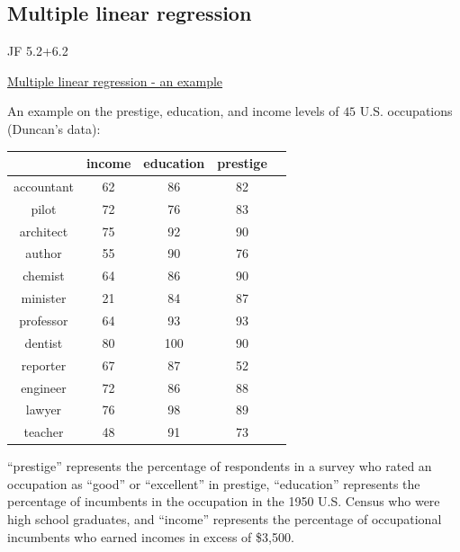 \subsection*{Multiple linear regression}
JF 5.2+6.2\\
\begin{center}
\underline{Multiple linear regression - an example}
\end{center}
An example on the prestige, education,  and income levels of $45$ U.S. occupations (Duncan's data):
\begin{center}
\begin{tabular}{ | c | c | c | c | c |}
\hline
 & income & education & prestige \\ 
\hline
accountant      & 62 &86 &82\\
pilot &72 &76 &83\\
architect & 75 &92 &90\\
author &55  &90 & 76\\
chemist   & 64 &  86 & 90\\
minister & 21 &  84 & 87\\
professor & 64 &  93 & 93\\
dentist & 80 & 100 & 90\\
reporter &   67 &  87 & 52\\
engineer & 72 &  86 & 88\\
lawyer & 76 &  98 & 89\\
teacher & 48 &  91 & 73\\
\hline
\end{tabular}
\end{center}
``prestige'' represents the percentage of respondents in a survey who rated an occupation as ``good'' or ``excellent'' in prestige,
``education'' represents the percentage of incumbents in the occupation in the 1950 U.S. Census who were high school graduates, 
and ``income'' represents the percentage of occupational incumbents who earned incomes in excess of \$3,500.

